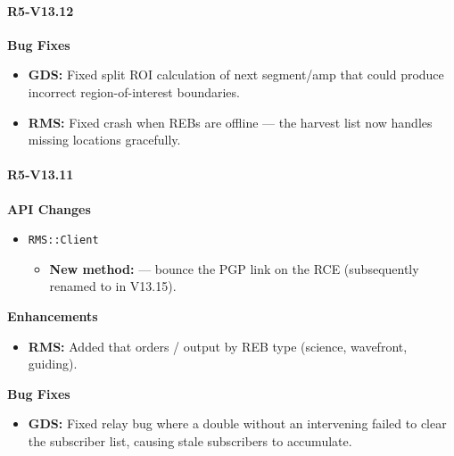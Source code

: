\paragraph{R5-V13.12}

\noindent\textbf{Bug Fixes}\par\nobreak
\begin{itemize}\compactlist
  \item \textbf{GDS:} Fixed split ROI calculation of next segment/amp that could
    produce incorrect region-of-interest boundaries.
  \item \textbf{RMS:} Fixed  crash when REBs are offline --- the
    harvest list now handles missing locations gracefully.
\end{itemize}


\paragraph{R5-V13.11}

\noindent\textbf{API Changes}\par\nobreak
\begin{itemize}\compactlist
  \item \texttt{RMS::Client}
  \begin{itemize}\compactlist
    \item \textbf{New method:}  --- bounce the PGP link on the RCE
      (subsequently renamed to  in V13.15).
  \end{itemize}
\end{itemize}
\noindent\textbf{Enhancements}\par\nobreak
\begin{itemize}\compactlist
  \item \textbf{RMS:} Added  that orders /
    output by REB type (science, wavefront, guiding).
\end{itemize}

\noindent\textbf{Bug Fixes}\par\nobreak
\begin{itemize}\compactlist
  \item \textbf{GDS:} Fixed relay bug where a double  without an intervening
     failed to clear the subscriber list, causing stale subscribers
    to accumulate.
\end{itemize}
\par\endgroup
